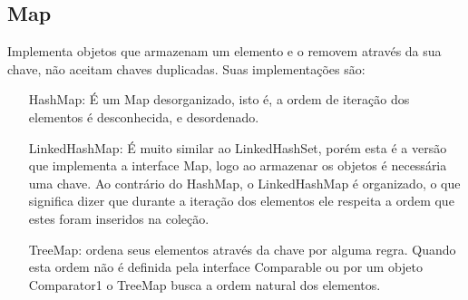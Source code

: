	\subsection{Map}
		Implementa objetos que armazenam um elemento e o removem através da sua chave, não aceitam chaves duplicadas. Suas implementações são:
		\begin{itemize}
			\item[HashMap:] É um Map desorganizado, isto é, a ordem de iteração dos elementos é desconhecida, e desordenado.
			\item[LinkedHashMap:] É muito similar ao LinkedHashSet, porém esta é a versão que implementa a interface Map, logo ao armazenar os objetos é necessária uma chave. Ao contrário do HashMap, o LinkedHashMap é organizado, o que significa dizer que durante a iteração dos elementos ele respeita a ordem que estes foram inseridos na coleção.
			\item[TreeMap:] ordena seus elementos através da chave por alguma regra. Quando esta ordem não é definida pela interface Comparable ou por um objeto Comparator1 o TreeMap busca a ordem natural dos elementos.
		\end{itemize}

